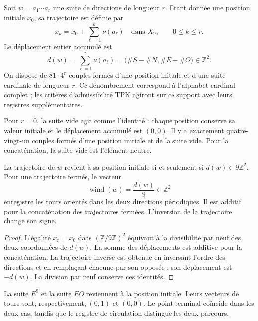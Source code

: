 Soit $w=a_1\cdots a_r$ une suite de directions de longueur $r$. Étant donnée une position initiale $x_0$, sa trajectoire est définie par
\[
 x_k=x_0+\sum_{\ell=1}^{k}\nu(a_\ell)\quad\text{dans }X_9,
 \qquad 0\leq k\leq r.
\]
Le déplacement entier accumulé est
\begin{equation}
 d(w)=\sum_{\ell=1}^{r}\nu(a_\ell)
      =\bigl(\#S-\#N,\#E-\#O\bigr)\in\mathbb Z^2.
 \label{eq:app-displacement}
\end{equation}
On dispose de $81\cdot4^r$ couples formés d'une position initiale et d'une suite cardinale de longueur $r$. Ce dénombrement correspond à l'alphabet cardinal complet ; les critères d'admissibilité TPK agiront sur ce support avec leurs registres supplémentaires.

Pour $r=0$, la suite vide agit comme l'identité : chaque position conserve sa valeur initiale et le déplacement accumulé est $(0,0)$. Il y a exactement quatre-vingt-un couples formés d'une position initiale et de la suite vide. Pour la concaténation, la suite vide est l'élément neutre.

\begin{bloqueindivisible}
\begin{teorema}
\label{thm:app-transporte}
La trajectoire de $w$ revient à sa position initiale si et seulement si $d(w)\in9\mathbb Z^2$. Pour une trajectoire fermée, le vecteur
\begin{equation}
 \operatorname{wind}(w)=\frac{d(w)}9\in\mathbb Z^2
\end{equation}
enregistre les tours orientés dans les deux directions périodiques. Il est additif pour la concaténation des trajectoires fermées. L'inversion de la trajectoire change son signe.
\end{teorema}

\begin{proof}
L'égalité $x_r=x_0$ dans $(\mathbb Z/9\mathbb Z)^2$ équivaut à la divisibilité par neuf des deux coordonnées de $d(w)$. La somme des déplacements est additive pour la concaténation. La trajectoire inverse est obtenue en inversant l'ordre des directions et en remplaçant chacune par son opposée ; son déplacement est $-d(w)$. La division par neuf conserve ces identités.
\end{proof}
\end{bloqueindivisible}

\begin{ejemplo}
La suite $E^9$ et la suite $EO$ reviennent à la position initiale. Leurs vecteurs de tours sont, respectivement, $(0,1)$ et $(0,0)$. Le point terminal coïncide dans les deux cas, tandis que le registre de circulation distingue les deux parcours.
\end{ejemplo}

